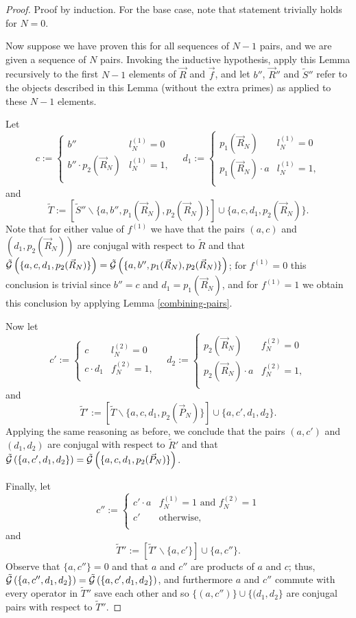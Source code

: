 \documentclass[twocolumn,showpacs,preprintnumbers,amsmath,amssymb,nofootinbib,pra,floatfix]{revtex4-1}
\newcommand{\lst}{\vec}
\newcommand{\set}{\tilde}
\newcommand{\genfun}{\tilde{\mathcal{G}}}
\begin{document}
\begin{proof}
Proof by induction.  For the base case, note that statement trivially holds for $N=0$.

Now suppose we have proven this for all sequences of $N-1$ pairs, and we are given a sequence of $N$ pairs.  Invoking the inductive hypothesis, apply this Lemma recursively to the first $N-1$ elements of $\lst R$ and $\lst f$, and let $b''$, $\lst R''$ and $\set S''$ refer to the objects described in this Lemma (without the extra primes) as applied to these $N-1$ elements.

Let
$$
c := 
\begin{cases}
b'' & l^{(1)}_N = 0\\
b'' \cdot p_2(\lst R_N)  &  l^{(1)}_N = 1,\\
\end{cases}
\quad
d_1 :=
\begin{cases}
p_1(\lst R_N) & l^{(1)}_N = 0\\
p_1(\lst R_N) \cdot a &  l^{(1)}_N = 1,\\
\end{cases}
$$
and
$$\set T := \left[\set S''\backslash\{a,b'',p_1(\lst R_N),p_2(\lst R_N)\}\right]\cup \{a,c,d_1,p_2(\lst R_N)\}.$$
Note that for either value of $f^{(1)}$ we have that the pairs $(a,c)$ and $(d_1,p_2(\lst R_N))$ are conjugal with respect to $\set R$ and that $\genfun\paren{\{a,c,d_1,p_2(\lst R_N)\}}=\genfun\paren{\{a,b'',p_1(\lst R_N),p_2(\lst R_N)\}}$; for $f^{(1)}=0$ this conclusion is trivial since $b''=c$ and $d_1=p_1(\lst R_N)$, and for $f^{(1)}=1$ we obtain this conclusion by applying Lemma \ref{combining-pairs}.

Now let
$$
c' := 
\begin{cases}
c & l^{(2)}_N = 0\\
c \cdot d_1  &  f^{(2)}_N = 1,\\
\end{cases}
\quad
d_2 :=
\begin{cases}
p_2(\lst R_N) & f^{(2)}_N = 0\\
p_2(\lst R_N) \cdot a &  f^{(2)}_N = 1,\\
\end{cases}
$$
and
$$\set T' := \left[\set T\backslash\{a,c,d_1,p_2(\lst P_N)\}\right]\cup \{a,c',d_1,d_2\}.$$
Applying the same reasoning as before, we conclude that the pairs $(a,c')$ and $(d_1,d_2)$ are conjugal with respect to $\set R'$ and that $\genfun\paren{\{a,c',d_1,d_2\}}=\genfun\paren{\{a,c,d_1,p_2(\lst P_N)\}}$.

Finally, let
$$c'' :=
\begin{cases}
c' \cdot a & f^{(1)}_N = 1 \,\,\text{and}\,\, f^{(2)}_N = 1 \\
c' & \text{otherwise},\\
\end{cases}
$$
and
$$
\set T'':=
\left[\set T'\backslash\{a,c'\}\right]\cup \{a,c''\}.
$$
Observe that $\{a,c''\}=0$ and that $a$ and $c''$ are products of $a$ and $c$;  thus, $\genfun\paren{\{a,c'',d_1,d_2\}}=\genfun\paren{\{a,c',d_1,d_2\}}$, and furthermore $a$ and $c''$ commute with every operator in $\set T''$ save each other and so $\{(a,c'')\} \cup \{(d_1,d_2\}$ are conjugal pairs with respect to $\set T''$.


\end{proof}
\end{document}
